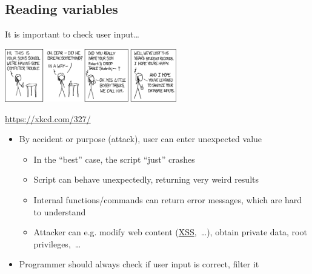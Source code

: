 \documentclass[compress, ucs, xelatex, 11pt, xcolor=svgnames,
  hyperref={
    bookmarks=true,
    unicode=true,
    colorlinks=true,
    pdftitle={Linux, command line and MetaCentrum},
    plainpages=false,
    pdfauthor={Vojtech Zeisek},
    pdfsubject={Course about use of Linux command line, writing shell scripts and using MetaCentrum of CESNET},
    pdfcreator={XeLaTeX},
    pdfkeywords={Linux, GNU, BASH, shell, command line, MetaCentrum},
    linkcolor=DarkRed,
    anchorcolor=DarkBlue,
    citecolor=Indigo,
    filecolor=NavyBlue,
    menucolor=DarkMagenta,
    urlcolor=DarkBlue,
    pdftex},
  url={hyphens, lowtilde} %
  ]{beamer}
\begin{document}
\subsection{Reading variables}

\begin{frame}{It is important to check user input\ldots}
  \begin{center}
    \includegraphics[width=7.5cm]{exploits_of_a_mom.png}
  \end{center}
  \begin{flushright}
    \url{https://xkcd.com/327/}
  \end{flushright}
  \begin{itemize}
    \item By accident or purpose (attack), user can enter unexpected value
    \begin{itemize}
      \item In the ``best'' case, the script ``just'' crashes
      \item Script can behave unexpectedly, returning very weird results
      \item Internal functions/commands can return error messages, which are hard to understand
      \item Attacker can e.g. modify web content (\href{https://en.wikipedia.org/wiki/Cross-site_scripting}{XSS},~\ldots), obtain private data, root privileges,~\ldots
    \end{itemize}
    \item Programmer should always check if user input is correct, filter it
  \end{itemize}
\end{frame}
\end{document}
